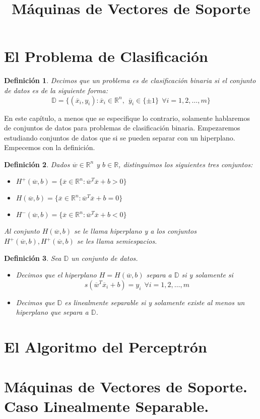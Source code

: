 \documentclass[11pt]{article}
\newtheorem{definition}{Definición}[section]
\newcommand{\R}{\mathbb{R}}
\newcommand{\Rn}{\R^{n}}
\newcommand{\wv}{\overline{w}}
\newcommand{\x}{\overline{x}}
\newcommand{\y}{\overline{y}}
\newcommand{\Sm}{1,2,\ldots, m}
\newcommand{\Dat}{\mathbb{D}}
\begin{document}
\title{Máquinas de Vectores de Soporte}
\section{El Problema de Clasificación}


\begin{definition}
Decimos que un problema es de clasificación binaria si el conjunto de datos es de la siguiente forma:
$$\Dat=\{(\x_{i}, y_i): \x_{i}\in\Rn,\ \ \y_{i}\in\{\pm1\}\ \ \forall i = \Sm\}$$
\end{definition}

En este capítulo, a menos que se especifique lo contrario, solamente hablaremos de conjuntos de datos para problemas de clasificación binaria.
Empezaremos estudiando conjuntos de datos que si se pueden separar con un hiperplano. Empecemos con la definición.

\begin{definition}
Dados $\wv\in\Rn$ y $b\in\R$, distinguimos los siguientes tres conjuntos:
\begin{itemize}
\item[(i)] $H^{+}(\wv, b)=\{\x\in\Rn:\wv^{T}\x+b>0\}$
\item[(ii)] $H(\wv, b)=\{\x\in\Rn:\wv^{T}\x+b=0\}$
\item[(iii)] $H^{-}(\wv, b)=\{\x\in\Rn:\wv^{T}\x+b<0\}$
\end{itemize}
Al conjunto $H(\wv, b)$ se le llama \emph{hiperplano} y a los conjuntos $H^{+}(\wv, b), H^{+}(\wv, b)$ se les llama \emph{semiespacios}.
\end{definition}

\begin{definition}
Sea $\Dat$ un conjunto de datos.
\begin{itemize}
\item[(i)] Decimos que el hiperplano $H=H(\wv, b)$ separa a $\Dat$ si y solamente si
$$s(\wv^{T}\x_{i}+b)=y_{i}\ \ \forall i=\Sm$$
\item[(ii)] Decimos que $\Dat$ es linealmente separable si y solamente existe al menos un hiperplano que separa a $\Dat$.
\end{itemize}
\end{definition}
\section{El Algoritmo del Perceptrón}
\section{Máquinas de Vectores de Soporte. Caso Linealmente Separable.}
\end{document}
